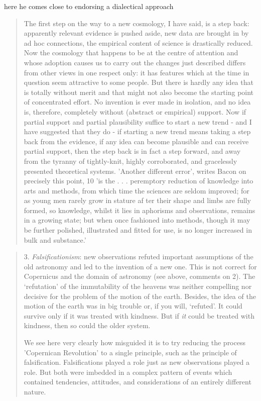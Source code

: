 here he comes close to endorsing a dialectical approach 

\begin{quote}
The first step on the way to a new cosmology, I have said, is a step
back: apparently relevant evidence is pushed aside, new data are
brought in by ad hoc connections, the empirical content of science is
drastically reduced. Now the cosmology that happens to be at the
centre of attention and whose adoption causes us to carry out the
changes just described differs from other views in one respect only: it
has features which at the time in question seem attractive to some
people. But there is hardly any idea that is totally without merit and
that might not also become the starting point of concentrated effort.
No invention is ever made in isolation, and no idea is, therefore,
completely without (abstract or empirical) support. Now if partial
support and partial plausibility suffice to start a new trend - and I
have suggested that they do - if starting a new trend means taking a
step back from the evidence, if any idea can become plausible and can
receive partial support, then the step back is in fact a step forward,
and away from the tyranny of tightly-knit, highly corroborated, and
gracelessly presented theoretical systems. 'Another different error',
writes Bacon on precisely this point, 10 'is the . . . peremptory
reduction of knowledge into arts and methods, from which time the
sciences are seldom improved; for as young men rarely grow in
stature af ter their shape and limbs are fully formed, so knowledge,
whilst it lies in aphorisms and observations, remains in a growing
state; but when once fashioned into methods, though it may be
further polished, illustrated and fitted for use, is no longer increased
in bulk and substance.'
\citep[117-118]{feyerabend1993against}
\end{quote}

\begin{quotation}
    3. \textit{Falsificationism}: new observations refuted important assumptions
of the old astronomy and led to the invention of a new one. This
is not correct for Copernicus and the domain of astronomy (see
above, comments on 2). The `refutation' of the immutability of the
heavens was neither compelling nor decisive for the problem of the
motion of the earth. Besides, 
the idea of the motion of the earth was
in big trouble or, if you will, `refuted'. It could survive only if it was
treated with kindness. But if \textit{it} could be treated with kindness, then so
could the older system.

We see here very clearly how misguided it is to try reducing the
process 'Copernican Revolution' to a single principle, such as the
principle of falsification. Falsifications played a role just as new
observations played a role. But both were imbedded in a complex
pattern of events which contained tendencies, attitudes, and
considerations of an entirely different nature.
\citep[145]{feyerabend1993against}
\end{quotation}



